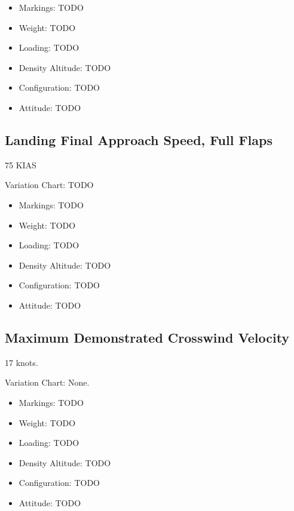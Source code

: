 \begin{itemize}
\item Markings: TODO
\item Weight: TODO
\item Loading: TODO
\item Density Altitude: TODO
\item Configuration: TODO
\item Attitude: TODO
\end{itemize}

\subsection{Landing Final Approach Speed, Full Flaps}

75 KIAS

Variation Chart: TODO
\begin{itemize}
\item Markings: TODO
\item Weight: TODO
\item Loading: TODO
\item Density Altitude: TODO
\item Configuration: TODO
\item Attitude: TODO
\end{itemize}

\subsection{Maximum Demonstrated Crosswind Velocity}

17 knots.

Variation Chart: None.

\begin{itemize}
\item Markings: TODO
\item Weight: TODO
\item Loading: TODO
\item Density Altitude: TODO
\item Configuration: TODO
\item Attitude: TODO
\end{itemize}

%
%

